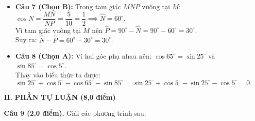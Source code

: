 \documentclass[12pt,a4paper]{article}
\begin{document}
\begin{itemize}[leftmargin=18pt, itemsep=3.5pt, parsep=0pt]
  Theo định nghĩa tỉ số lượng giác của góc nhọn $C$: $\cos C = \dfrac{AC}{BC} = \dfrac{4}{5}$.
  \item \textbf{Câu 7 (Chọn B):} Trong tam giác $MNP$ vuông tại $M$:\\
  $\cos N = \dfrac{MN}{NP} = \dfrac{5}{10} = \dfrac{1}{2} \implies \widehat{N} = 60^\circ$.\\
  Vì tam giác vuông tại $M$ nên $\widehat{P} = 90^\circ - \widehat{N} = 90^\circ - 60^\circ = 30^\circ$.\\
  Suy ra: $\widehat{N} - \widehat{P} = 60^\circ - 30^\circ = 30^\circ$.
  \item \textbf{Câu 8 (Chọn A):} Vì hai góc phụ nhau nên: $\cos 65^\circ = \sin 25^\circ$ và $\sin 85^\circ = \cos 5^\circ$.\\
  Thay vào biểu thức ta được:
  \[
    \sin 25^\circ + \cos 5^\circ - \cos 65^\circ - \sin 85^\circ = \sin 25^\circ + \cos 5^\circ - \sin 25^\circ - \cos 5^\circ = 0.
  \]
\end{itemize}

\newpage

\noindent\textbf{\large II. PHẦN TỰ LUẬN (8,0 điểm)}

\vspace{1.5mm}
\noindent\textbf{Câu 9 (2,0 điểm).} Giải các phương trình sau:
\end{document}
